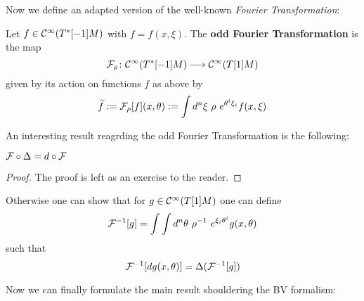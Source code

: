 Now we define an adapted version of the well-known \emph{Fourier Transformation}:

\begin{definition}
  Let $f \in \mathcal{C}^{\infty}(T^*[-1]M)$ with $f = f(x, \xi)$. The \textbf{odd Fourier Transformation} is the map
  \begin{equation}
    {\mathcal{F}}_\rho \colon \mathcal{C}^{\infty}(T^*[-1]M) \longrightarrow \mathcal{C}^{\infty}(T[1]M)
  \end{equation}
  given by its action on functions $f$ as above by
  \begin{equation}
    \widetilde{f} := {\mathcal{F}}_\rho [f](x, \theta) := \int d^n \xi \ \rho \ e^{\theta^i \xi_i} f(x, \xi)
  \end{equation}
\end{definition}

An interesting result reagrding the odd Fourier Transformation is the following:

\begin{prop}
  ${\mathcal{F}} \circ \Delta = d \circ {\mathcal{F}}$
\begin{proof}
  The proof is left as an exercise to the reader.
\end{proof}
\end{prop}

Otherwise one can show that for $g \in \mathcal{C}^{\infty}(T[1]M)$ one can define
\begin{equation}
  \FF^{-1}[g] = \int \int d^n \theta \ \rho^{-1} \ e^{\xi_i \theta^i} g(x, \theta)
\end{equation}
such that
\begin{equation}
  {\mathcal{F}}^{-1}[dg(x, \theta)] = \Delta({\mathcal{F}}^{-1}[g])
\end{equation}

Now we can finally formulate the main result shouldering the BV formalism:

